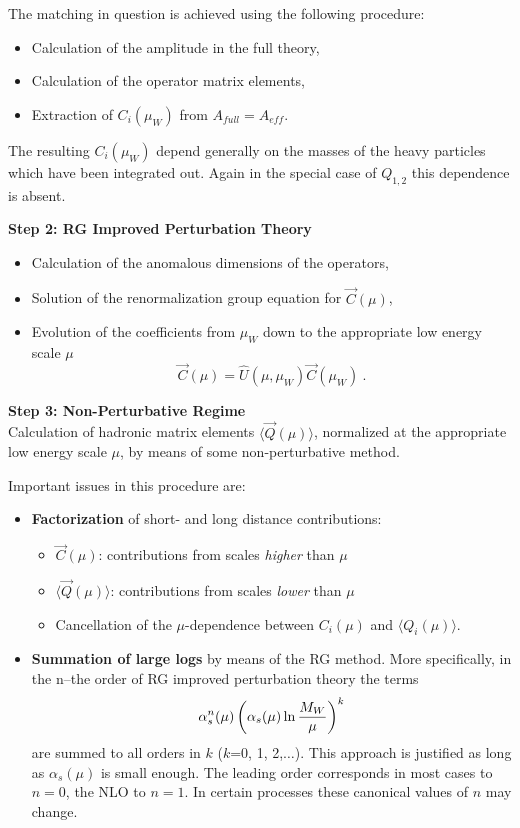 \documentclass[12pt,rotate]{article}
\def\as{\alpha_s}
\begin{document}
\begin{itemize}
\begin{itemize}
\begin{itemize}
The matching in question is achieved using the following procedure:

\begin{itemize}
\item
Calculation of the amplitude in the full theory,
\item
Calculation of the operator matrix elements,
\item
Extraction of $C_i(\mu_W)$ from $A_{full}=A_{eff}$.
\end{itemize}
The resulting $C_i(\mu_W)$ depend generally on the masses of the
heavy particles which have been integrated out. Again in the
special case of $Q_{1,2}$ this dependence is absent.

\noindent
{\bf Step 2: RG Improved Perturbation Theory}
\begin{itemize}
\item Calculation of the anomalous dimensions of the operators,
\item Solution of the renormalization group equation for $\vec{C}(\mu)$,
\item Evolution of the coefficients from $\mu_W$ down to the
appropriate low energy scale $\mu$
\begin{displaymath}
\vec C(\mu)=\hat U(\mu, \mu_W)\vec C(\mu_W)~.
\end{displaymath}
\end{itemize}

\medskip
\noindent
{\bf Step 3: Non-Perturbative Regime}
\\
Calculation of hadronic matrix elements $\langle\vec Q(\mu)\rangle$,
normalized at the appropriate low energy scale $\mu$, by means of
some non-perturbative method.

\bigskip
\noindent
Important issues in this procedure are:
\begin{itemize}
\item {\bf Factorization\/} of short- and long
distance contributions:
\begin{itemize}
\item
 $\vec C(\mu)$: contributions from scales {\it higher} than $\mu$
\item 
$\langle \vec Q(\mu)\rangle$: contributions from scales {\it lower}
than $\mu$
\item 
Cancellation of  the $\mu$-dependence
between $C_i(\mu)$ and
$\langle Q_i(\mu)\rangle$.
\end{itemize}
\item  {\bf Summation of large logs\/} by means of the RG method.
 More specifically, in the n--the  order of
RG improved perturbation theory the terms 
\begin{displaymath}
\as^n(\mu)
\left(\as(\mu)\ln{M_W\over\mu}\right)^k
\end{displaymath}
are summed to all orders in $k$ ($k$=0, 1, 2,$\ldots$). This approach
is justified as long as $\as(\mu)$ is small enough. The leading order
corresponds in most cases to $n=0$, the NLO to $n=1$. In certain
processes these canonical values of $n$ may change.
\end{itemize}


\end{itemize}
\end{itemize}
\end{itemize}
\end{document}
